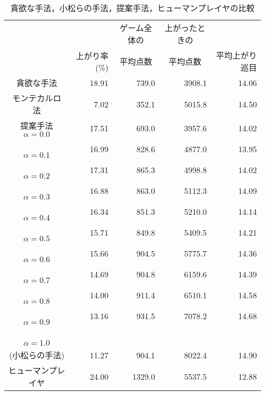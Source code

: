 \begin{table}[t]
	\caption{貪欲な手法，小松らの手法，提案手法，ヒューマンプレイヤの比較}
	\label{skpcomparison}
	\begin{center}
	 \begin{tabular}{|c|r|r|r|r|}
	 	\hline
	 	&             & \multicolumn{1}{c|}{ゲーム全体の} & \multicolumn{1}{c|}{上がったときの} & \\
	 	& 上がり率(\%) & \multicolumn{1}{c|}{平均点数}     & \multicolumn{1}{c|}{平均点数}     & 平均上がり巡目 \\ \hline
	 	貪欲な手法           & 18.91 & 739.0 & 3908.1 & 14.06 \\ \hline 
	 	モンテカルロ法        & 7.02 	& 352.1 & 5015.8 & 14.50 \\ \hline
	 	提案手法$\alpha=0.0$ & 17.51 & 693.0 & 3957.6 & 14.02 \\ \hline
	 	　　　　$\alpha=0.1$ & 16.99 & 828.6 & 4877.0 & 13.95 \\ \hline
	 	　　　　$\alpha=0.2$ & 17.31 & 865.3 & 4998.8 & 14.02 \\ \hline
	 	　　　　$\alpha=0.3$ & 16.88 & 863.0 & 5112.3 & 14.09 \\ \hline
	 	　　　　$\alpha=0.4$ & 16.34 & 851.3 & 5210.0 & 14.14 \\ \hline
	 	　　　　$\alpha=0.5$ & 15.71 & 849.8 & 5409.5 & 14.21 \\ \hline
		　　　　$\alpha=0.6$ & 15.66 & 904.5 & 5775.7 & 14.36 \\ \hline
		　　　　$\alpha=0.7$ & 14.69 & 904.8 & 6159.6 & 14.39 \\ \hline
		　　　　$\alpha=0.8$ & 14.00 & 911.4 & 6510.1 & 14.58 \\ \hline
		　　　　$\alpha=0.9$ & 13.16 & 931.5 & 7078.2 & 14.68 \\ \hline
		　　　　$\alpha=1.0$ & & & & \\
			   (小松らの手法) & 11.27 & 904.1 & 8022.4 & 14.90 \\ \hline
		ヒューマンプレイヤ     & 24.00 & 1329.0 & 5537.5 & 12.88 \\ \hline
	 \end{tabular}
	\end{center}
\end{table}
